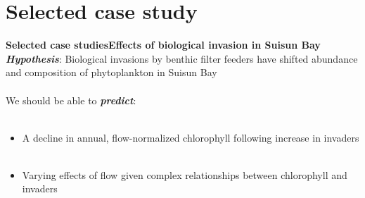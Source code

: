 \documentclass[serif]{beamer}\usepackage[]{graphicx}\usepackage[]{color}
\newcommand{\emtxt}[1]{\textbf{\textit{#1}}}
\begin{document}
\section{Selected case study}

\begin{frame}{\textbf{Selected case studies}}{\textbf{Effects of biological invasion in Suisun Bay}}
\emtxt{Hypothesis}: Biological invasions by benthic filter feeders have shifted abundance and composition of phytoplankton in Suisun Bay \\~\\
We should be able to \emtxt{predict}: \\~\\
\begin{itemize}
\item A decline in annual, flow-normalized chlorophyll following increase in invaders\\~\\
\item Varying effects of flow given complex relationships between chlorophyll and invaders
\end{itemize}
\end{frame}
\end{document}
